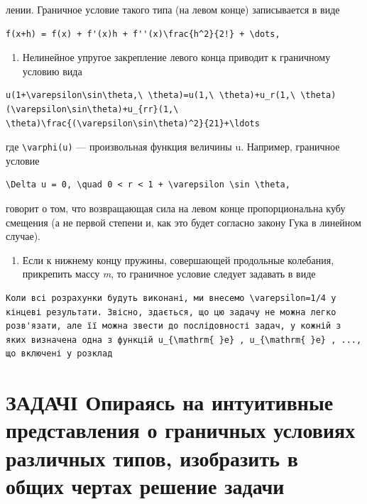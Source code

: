 \documentclass[
  ukrainian,
]{article}
\providecommand{\tightlist}{%
  \setlength{\itemsep}{0pt}\setlength{\parskip}{0pt}}
\begin{document}
лении. Граничное условие такого типа (на левом конце) записывается в
виде

\begin{verbatim}
f(x+h) = f(x) + f'(x)h + f''(x)\frac{h^2}{2!} + \dots,
\end{verbatim}

\begin{enumerate}
\def\labelenumi{\arabic{enumi}.}
\setcounter{enumi}{1}
\tightlist
\item
  Нелинейное упругое закрепление левого конца приводит к граничному
  условию вида
\end{enumerate}

\begin{verbatim}
u(1+\varepsilon\sin\theta,\ \theta)=u(1,\ \theta)+u_r(1,\ \theta)(\varepsilon\sin\theta)+u_{rr}(1,\ \theta)\frac{(\varepsilon\sin\theta)^2}{21}+\ldots
\end{verbatim}

где \texttt{\textbackslash{}varphi(u)} --- произвольная функция величины
u. Например, граничное условие

\begin{verbatim}
\Delta u = 0, \quad 0 < r < 1 + \varepsilon \sin \theta,
\end{verbatim}

говорит о том, что возвращающая сила на левом конце пропорциональна кубу
смещения (а не первой степени и, как это будет согласно закону Гука в
линейном случае).

\begin{enumerate}
\def\labelenumi{\arabic{enumi}.}
\setcounter{enumi}{2}
\tightlist
\item
  Если к нижнему концу пружины, совершающей продольные колебания,
  прикрепить массу \emph{m}, то граничное условие следует задавать в
  виде
\end{enumerate}

\begin{verbatim}
Коли всі розрахунки будуть виконані, ми внесемо \varepsilon=1/4 у кінцеві результати. Звісно, здається, що цю задачу не можна легко розв'язати, але її можна звести до послідовності задач, у кожній з яких визначена одна з функцій u_{\mathrm{ }e} , u_{\mathrm{ }e} , ..., що включені у розклад
\end{verbatim}

\section{ЗАДАЧІ Опираясь на интуитивные представления о граничных
условиях различных типов, изобразить в общих чертах решение
задачи}\label{ux437ux430ux434ux430ux447ux456-ux43eux43fux438ux440ux430ux44fux441ux44c-ux43dux430-ux438ux43dux442ux443ux438ux442ux438ux432ux43dux44bux435-ux43fux440ux435ux434ux441ux442ux430ux432ux43bux435ux43dux438ux44f-ux43e-ux433ux440ux430ux43dux438ux447ux43dux44bux445-ux443ux441ux43bux43eux432ux438ux44fux445-ux440ux430ux437ux43bux438ux447ux43dux44bux445-ux442ux438ux43fux43eux432-ux438ux437ux43eux431ux440ux430ux437ux438ux442ux44c-ux432-ux43eux431ux449ux438ux445-ux447ux435ux440ux442ux430ux445-ux440ux435ux448ux435ux43dux438ux435-ux437ux430ux434ux430ux447ux438}
\end{document}
